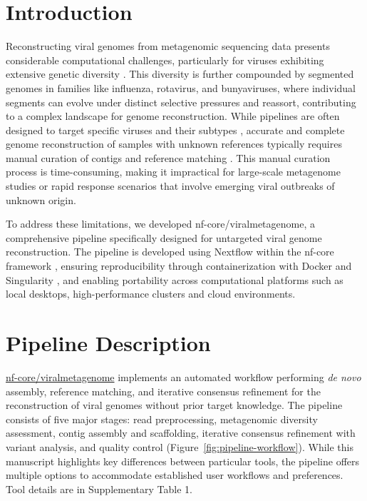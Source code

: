 
\section{Introduction}
Reconstructing viral genomes from metagenomic sequencing data presents considerable computational challenges, particularly for viruses exhibiting extensive genetic diversity \cite{Baaijens2017-hw,Deng2021-nl,Meleshko2021-gb}. This diversity is further compounded by segmented genomes in families like influenza, rotavirus, and bunyaviruses, where individual segments can evolve under distinct selective pressures and reassort, contributing to a complex landscape for genome reconstruction. While pipelines are often designed to target specific viruses and their subtypes \cite{Shepard2016-uh}, accurate and complete genome reconstruction of samples with unknown references typically requires manual curation of contigs and reference matching \cite{Tomkins-Tinch2017-qi,Li2025-uh}. This manual curation process is time-consuming, making it impractical for large-scale metagenome studies or rapid response scenarios that involve emerging viral outbreaks of unknown origin.

To address these limitations, we developed nf-core/viralmetagenome, a comprehensive pipeline specifically designed for untargeted viral genome reconstruction. The pipeline is developed using Nextflow \cite{Di-Tommaso2017-nz} within the nf-core framework \cite{Ewels2020-kk}, ensuring reproducibility through containerization with Docker \cite{Merkel2014-hn} and Singularity \cite{Kurtzer2017-iw}, and enabling portability across computational platforms such as local desktops, high-performance clusters and cloud environments.

\section{Pipeline Description}

\href{https://github.com/nf-core/viralmetagenome}{nf-core/viralmetagenome} implements an automated workflow performing \textit{de novo} assembly, reference matching, and iterative consensus refinement for the reconstruction of  viral genomes without prior target knowledge. The pipeline consists of five major stages: read preprocessing, metagenomic diversity assessment, contig assembly and scaffolding, iterative consensus refinement with variant analysis, and quality control (Figure~\ref{fig:pipeline-workflow}). While this manuscript highlights key differences between particular tools, the pipeline offers multiple options to accommodate established user workflows and preferences. Tool details are in Supplementary Table 1.

